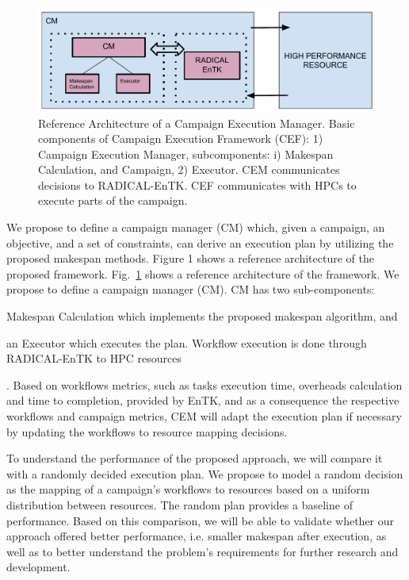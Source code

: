 \begin{figure}[t]
	\centering
	\includegraphics[width=.95\textwidth]{Proposal/extended_abstract/CEM_RefArch.pdf}
	\caption{Reference Architecture of a Campaign Execution Manager. Basic components of Campaign Execution Framework (CEF): 1) Campaign Execution Manager, subcomponents: i) Makespan Calculation, and Campaign, 2) Executor. CEM communicates decisions to RADICAL-EnTK. CEF communicates with HPCs to execute parts of the campaign.}\label{refarch}
\end{figure}


We propose to define a campaign manager (CM) which, given a campaign, an objective, and a set of constraints, can derive an execution plan by utilizing the proposed makespan methods. Figure 1 shows a reference architecture of the proposed framework. Fig.~\ref{refarch} shows a reference architecture of the framework. We propose to define a campaign manager (CM). CM has two sub-components: 
\begin{inparaenum}[(1)]
\item Makespan Calculation which implements the proposed makespan algorithm, and 
\item an Executor which executes the plan. Workflow execution is done through RADICAL-EnTK to HPC resources
\end{inparaenum}.
Based on workflows metrics, such as tasks execution time, overheads calculation and time to completion, provided by EnTK,  and as a consequence the respective workflows and campaign metrics, CEM will adapt the execution plan if necessary by updating the workflows to resource mapping decisions.


To understand the performance of the proposed approach, we will compare it with a randomly decided execution plan. We propose to model a random decision as the mapping of a campaign’s workflows to resources based on a uniform distribution between resources. The random plan provides a baseline of performance. Based on this comparison, we will be able to validate whether our approach offered better performance, i.e. smaller makespan after execution, as well as to better understand the problem’s requirements for further research and development.


